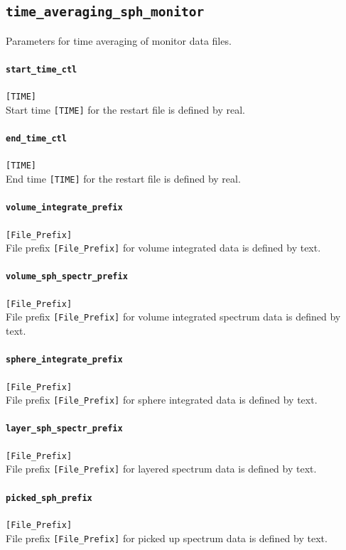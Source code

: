 \subsection{\tt time\_averaging\_sph\_monitor}
\label{href_t:time_averaging_sph_monitor}
Parameters for time averaging of monitor data files.

\paragraph{\tt start\_time\_ctl}
\label{href_t:tave_start_time_ctl} 
\verb|[TIME]| \\
Start  time \verb|[TIME]| for the restart file is defined by real.

\paragraph{\tt end\_time\_ctl}
\label{href_t:tave_end_time_ctl} 
\verb|[TIME]| \\
End  time \verb|[TIME]| for the restart file is defined by real.

\paragraph{\tt volume\_integrate\_prefix}
\label{href_t:volume_integrate_prefix} 
\verb|[File_Prefix]| \\
File prefix \verb|[File_Prefix]|  for  volume integrated data is defined by text.

\paragraph{\tt volume\_sph\_spectr\_prefix}
\label{href_t:volume_sph_spectr_prefix} 
\verb|[File_Prefix]| \\
File prefix \verb|[File_Prefix]|  for  volume integrated spectrum data is defined by text.

\paragraph{\tt sphere\_integrate\_prefix}
\label{href_t:sphere_integrate_prefix} 
\verb|[File_Prefix]| \\
File prefix \verb|[File_Prefix]|  for sphere integrated data is defined by text.

\paragraph{\tt layer\_sph\_spectr\_prefix}
\label{href_t:layer_sph_spectr_prefix} 
\verb|[File_Prefix]| \\
File prefix \verb|[File_Prefix]|  for  layered spectrum data is defined by text.

\paragraph{\tt picked\_sph\_prefix}
\label{href_t:picked_sph_prefix} 
\verb|[File_Prefix]| \\
File prefix \verb|[File_Prefix]|  for  picked up spectrum data is defined by text.


